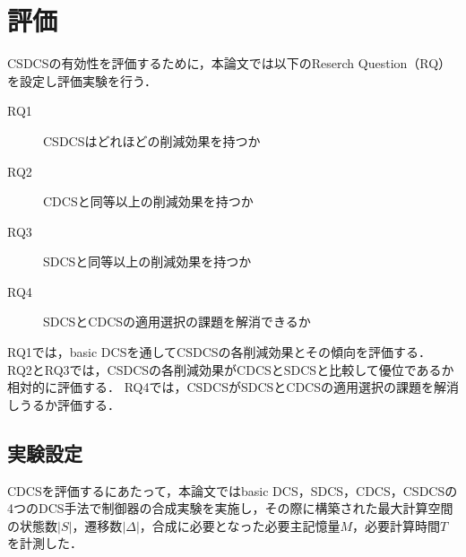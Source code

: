 \section{評価}
\label{section:evaluation}
CSDCSの有効性を評価するために，本論文では以下のReserch Question（RQ）を設定し評価実験を行う．

{
\begin{description}
  \item[RQ1] CSDCSはどれほどの削減効果を持つか
  \item[RQ2] CDCSと同等以上の削減効果を持つか
  \item[RQ3] SDCSと同等以上の削減効果を持つか
  \item[RQ4] SDCSとCDCSの適用選択の課題を解消できるか
\end{description}
}

RQ1では，basic DCSを通してCSDCSの各削減効果とその傾向を評価する．
RQ2とRQ3では，CSDCSの各削減効果がCDCSとSDCSと比較して優位であるか相対的に評価する．
RQ4では，CSDCSがSDCSとCDCSの適用選択の課題を解消しうるか評価する．

\subsection{実験設定}
CDCSを評価するにあたって，本論文ではbasic DCS，SDCS，CDCS，CSDCSの4つのDCS手法で制御器の合成実験を実施し，その際に構築された最大計算空間の状態数$|S|$，遷移数$|\Delta|$，合成に必要となった必要主記憶量$M$，必要計算時間$T$を計測した．

